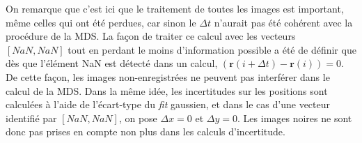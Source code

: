 \documentclass[11pt,letterpaper]{article}
\begin{document}
On remarque que c'est ici que le traitement de toutes les images est important, même celles qui ont été perdues, car sinon le $\Delta t$ n'aurait pas été cohérent avec la procédure de la MDS. 
La façon de traiter ce calcul avec les vecteurs $\left [ NaN ,NaN \right ]$ tout en perdant le moins d'information possible a été de définir que 
dès que l’élément NaN est détecté dans un calcul, $\left( \mathbf{r}(i+\Delta t) - \mathbf{r}(i) \right)=0$. De cette façon, les images non-enregistrées
ne peuvent pas interférer dans le calcul de la MDS. Dans la même idée, les incertitudes sur les positions sont calculées à l'aide de l'écart-type 
du \textit{fit} gaussien, et dans le cas d'une vecteur identifié par $[NaN, NaN]$, on pose $\Delta x=0$ et $\Delta y=0$. Les images noires ne sont donc pas prises en compte non plus dans les calculs d'incertitude.  
\end{document}

